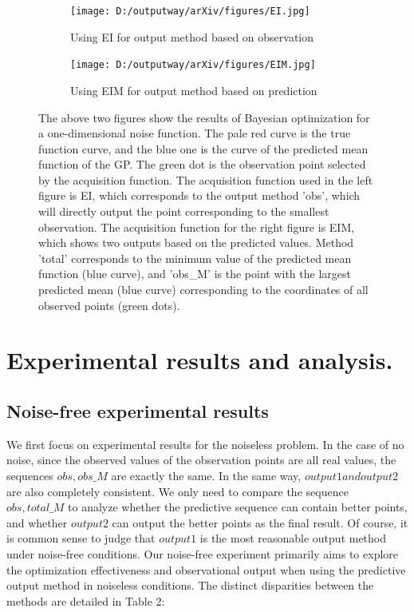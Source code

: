 \documentclass{article}
\begin{document}
\begin{figure}[H]
    \centering
    \begin{subfigure}[t]{.48\linewidth}
        \centering
        \texttt{[image: D:/outputway/arXiv/figures/EI.jpg]}
        \caption{Using EI for output method based on observation}
    \end{subfigure}
    \begin{subfigure}[t]{.48\linewidth}
        \centering
        \texttt{[image: D:/outputway/arXiv/figures/EIM.jpg]}
        \caption{Using EIM for output method based on prediction}
    \end{subfigure}
    \caption{The above two figures show the results of Bayesian optimization for a one-dimensional noise function. The pale red curve is the true function curve, and the blue one is the curve of the predicted mean function of the GP. The green dot is the observation point selected by the acquisition function. The acquisition function used in the left figure is EI, which corresponds to the output method 'obs', which will directly output the point corresponding to the smallest observation. The acquisition function for the right figure is EIM, which shows two outputs based on the predicted values. Method 'total' corresponds to the minimum value of the predicted mean function (blue curve), and 'obs\_M' is the point with the largest predicted mean (blue curve) corresponding to the coordinates of all observed points (green dots).}
    \label{Fig1}
\end{figure}




\section{Experimental results and analysis.}
  \subsection{Noise-free experimental results}
  \hspace{2em}We first focus on experimental results for the noiseless problem. In the case of no noise, since the observed values of the observation points are all real values, the sequences $obs, obs\_M$ are exactly the same. In the same way, $output1 and output2$ are also completely consistent. We only need to compare the sequence $obs,total\_M$ to analyze whether the predictive sequence can contain better points, and whether $output2$ can output the better points as the final result. Of course, it is common sense to judge that $output1$ is the most reasonable output method under noise-free conditions. Our noise-free experiment primarily aims to explore the optimization effectiveness and observational output when using the predictive output method in noiseless conditions. The distinct disparities between the methods are detailed in Table 2:
\end{document}
